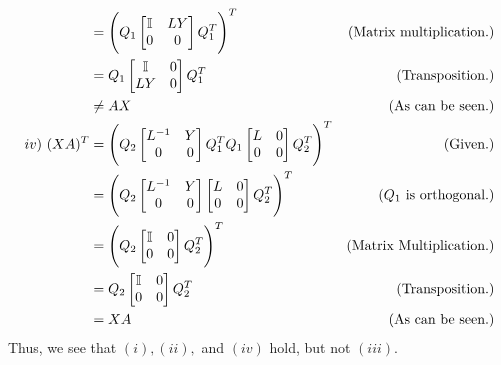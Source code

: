 \begin{solution}
\begin{align}
        &= \Bigg( Q_1\begin{bmatrix}\mathbb{I} &LY \\ 0 &0\end{bmatrix}Q_1^T\Bigg)^T &\text{(Matrix multiplication.)}\nonumber\\
        &=  Q_1\begin{bmatrix}\mathbb{I} &0 \\ LY &0\end{bmatrix}Q_1^T &\text{(Transposition.)}\nonumber\\
        &\neq AX &\text{(As can be seen.)}\nonumber\\
        iv) \ (XA)^T &= \Bigg( Q_2 \begin{bmatrix}L^{-1} &Y \\ 0&0\end{bmatrix}Q_1^TQ_1\begin{bmatrix}L &0\\0 &0\end{bmatrix}Q_2^T\Bigg)^T &\text{(Given.)}\nonumber\\
        &= \Bigg( Q_2 \begin{bmatrix}L^{-1} &Y \\ 0&0\end{bmatrix}\begin{bmatrix}L &0\\0 &0\end{bmatrix}Q_2^T\Bigg)^T &\text{($Q_1$ is orthogonal.)}\nonumber\\
        &= \Bigg( Q_2 \begin{bmatrix}\mathbb{I} &0 \\ 0 &0\end{bmatrix}Q_2^T\Bigg)^T &\text{(Matrix Multiplication.)}\nonumber\\
        &= Q_2 \begin{bmatrix}\mathbb{I} &0 \\ 0 &0\end{bmatrix}Q_2^T &\text{(Transposition.)}\nonumber\\
        &= XA &\text{(As can be seen.)}\nonumber
    \end{align}
    \alignbreak
    Thus, we see that $(i), (ii),$ and $(iv)$ hold, but not $(iii)$.
\end{solution}

\newpage
